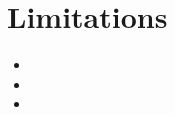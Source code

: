 \section{Limitations}
\label{sec:limitations}

\begin{itemize}
  \item %
  \item %
  \item %
\end{itemize}
